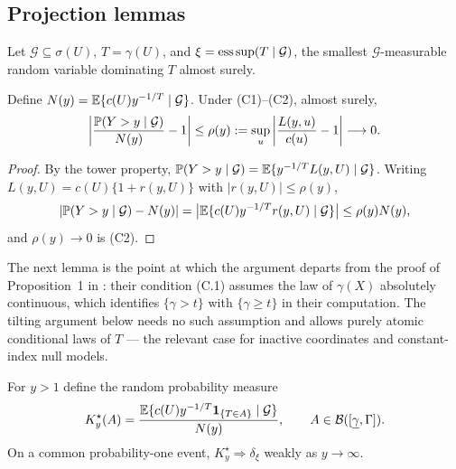 \subsection{Projection lemmas}\label{app:projlem}

Let $\mathcal G\subseteq\sigma(U)$, $T=\gamma(U)$, and
$\xi=\operatorname*{ess\,sup}(T\mid\mathcal G)$, the smallest $\mathcal G$-measurable random
variable dominating $T$ almost surely.

\begin{lemma}\label{lem:app-remainder}
Define $N(y)=\mathbb E\{c(U)y^{-1/T}\mid\mathcal G\}$.  Under (C1)--(C2), almost
surely,
\begin{equation}
 \left|\frac{\mathbb P(Y>y\mid\mathcal G)}{N(y)}-1\right|
 \le\rho(y):=\sup_u\left|\frac{L(y,u)}{c(u)}-1\right|\longrightarrow0.
 \label{eq:A1}
\end{equation}
\end{lemma}

\begin{proof}
By the tower property,
$\mathbb P(Y>y\mid\mathcal G)=\mathbb E\{y^{-1/T}L(y,U)\mid\mathcal G\}$.  Writing
$L(y,U)=c(U)\{1+r(y,U)\}$ with $|r(y,U)|\le\rho(y)$,
\[
 |\mathbb P(Y>y\mid\mathcal G)-N(y)|
 =\bigl|\mathbb E\{c(U)y^{-1/T}r(y,U)\mid\mathcal G\}\bigr|
 \le\rho(y)N(y),
\]
and $\rho(y)\to0$ is (C2).
\end{proof}

The next lemma is the point at which the argument departs from the proof
of Proposition~1 in \citet{gardesPodgorny2025}: their condition (C.1)
assumes the law of $\gamma(X)$ absolutely continuous, which identifies
$\{\gamma>t\}$ with $\{\gamma\ge t\}$ in their computation.  The tilting
argument below needs no such assumption and allows purely atomic
conditional laws of $T$ --- the relevant case for inactive coordinates
and constant-index null models.

\begin{lemma}\label{lem:app-tilt}
For $y>1$ define the random probability measure
\[
 K_y^\star(A)=
 \frac{\mathbb E\{c(U)y^{-1/T}\mathbf 1_{\{T\in A\}}\mid\mathcal G\}}{N(y)},
 \qquad A\in\mathcal B([\underline\gamma,\Gamma]).
\]
On a common probability-one event, $K_y^\star\Rightarrow\delta_\xi$ weakly
as $y\to\infty$.
\end{lemma}

